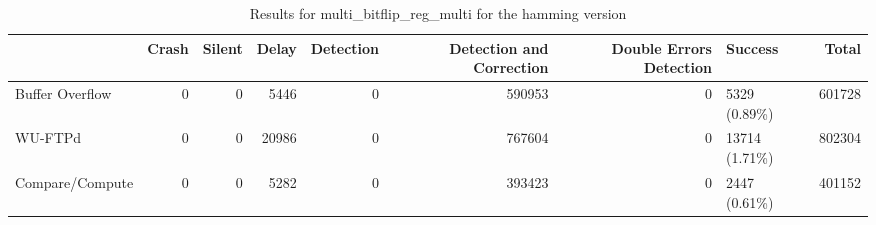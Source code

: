 \begin{table}[t]
	\centering
	\caption{Results for multi_bitflip_reg_multi for the hamming version}
	\label{table:end_sim_by_status_hamming_4_multi_bitflip_reg_multi}
	\begin{tabular}{lrrrrrrlr}
		\toprule
		                & Crash & Silent & Delay & Detection & Detection and Correction & Double Errors Detection & Success        & Total  \\
		\midrule
		Buffer Overflow & 0     & 0      & 5446  & 0         & 590953                   & 0                       & 5329 (0.89\%)  & 601728 \\
		WU-FTPd         & 0     & 0      & 20986 & 0         & 767604                   & 0                       & 13714 (1.71\%) & 802304 \\
		Compare/Compute & 0     & 0      & 5282  & 0         & 393423                   & 0                       & 2447 (0.61\%)  & 401152 \\
		\bottomrule
	\end{tabular}
\end{table}

